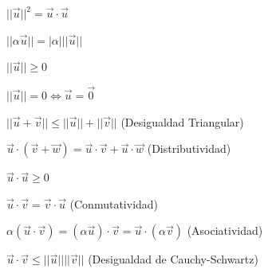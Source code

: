 \documentclass{article}
\theoremstyle{plain}
\theoremstyle{definition}
\begin{document}
\begin{center}
$||\overrightarrow{u} ||^2 = \overrightarrow{u}  \cdot \overrightarrow{u}  $
\end{center}

\begin{center}
$||\alpha \overrightarrow{u} || = |\alpha| || \overrightarrow{u} ||$
\end{center}

\begin{center}
$|| \overrightarrow{u} || \geq 0$
\end{center}

\begin{center}
$|| \overrightarrow{u} || = 0 \Leftrightarrow \overrightarrow{u} =\overrightarrow{0} $
\end{center}

\begin{center}
$|| \overrightarrow{u} + \overrightarrow{v}|| \leq ||\overrightarrow{u}|| +||\overrightarrow{v}|| $ (Desigualdad Triangular)
\end{center}


\begin{center}
$ \overrightarrow{u} \cdot ( \overrightarrow{v} + \overrightarrow{w}) = \overrightarrow{u} \cdot \overrightarrow{v} + \overrightarrow{u} \cdot \overrightarrow{w}$ (Distributividad)
\end{center}

\begin{center}
$\overrightarrow{u} \cdot \overrightarrow{u} \geq 0$
\end{center}


\begin{center}
$\overrightarrow{u} \cdot \overrightarrow{v} = \overrightarrow{v} \cdot \overrightarrow{u}$ (Conmutatividad)
\end{center}

\begin{center}
$\alpha (\overrightarrow{u} \cdot \overrightarrow{v}) = (\alpha \overrightarrow{u}) \cdot \overrightarrow{v} = \overrightarrow{u} \cdot (\alpha \overrightarrow{v})$ (Asociatividad)
\end{center}






\begin{center}
$\overrightarrow{u} \cdot \overrightarrow{v} \leq ||\overrightarrow{u}|| ||\overrightarrow{v}||$ (Desigualdad de Cauchy-Schwartz)
\end{center}
\end{document}
